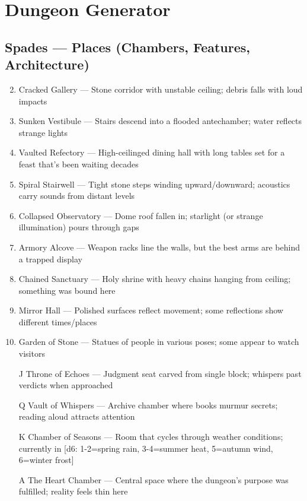 \chapter{Dungeon Generator}
\label{chap:dungeon-generator}

\section*{Spades --- Places (Chambers, Features, Architecture)}
\label{sec:dungeon-places}
\begin{enumerate}
\setcounter{enumi}{1}
\item Cracked Gallery --- Stone corridor with unstable ceiling; debris falls with loud impacts
\item Sunken Vestibule --- Stairs descend into a flooded antechamber; water reflects strange lights
\item Vaulted Refectory --- High-ceilinged dining hall with long tables set for a feast that's been waiting decades
\item Spiral Stairwell --- Tight stone steps winding upward/downward; acoustics carry sounds from distant levels
\item Collapsed Observatory --- Dome roof fallen in; starlight (or strange illumination) pours through gaps
\item Armory Alcove --- Weapon racks line the walls, but the best arms are behind a trapped display
\item Chained Sanctuary --- Holy shrine with heavy chains hanging from ceiling; something was bound here
\item Mirror Hall --- Polished surfaces reflect movement; some reflections show different times/places
\item Garden of Stone --- Statues of people in various poses; some appear to watch visitors
\item[J] Throne of Echoes --- Judgment seat carved from single block; whispers past verdicts when approached
\item[Q] Vault of Whispers --- Archive chamber where books murmur secrets; reading aloud attracts attention
\item[K] Chamber of Seasons --- Room that cycles through weather conditions; currently in [d6: 1-2=spring rain, 3-4=summer heat, 5=autumn wind, 6=winter frost]
\item[A] The Heart Chamber --- Central space where the dungeon's purpose was fulfilled; reality feels thin here
\end{enumerate}

